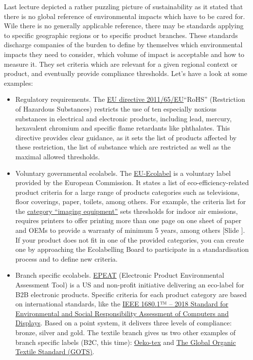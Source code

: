 \documentclass{article}
\newcounter{slide}
\begin{document}
Last lecture depicted a rather puzzling picture of sustainability as it stated that there is no global reference of environmental impacts which have to be cared for. Wile there is no generally applicable reference, there may be standards applying to specific geographic regions or to specific product branches. These standards discharge companies of the burden to define by themselves which environmental impacts they need to consider, which volume of impact is acceptable and how to measure it. They set criteria which are relevant for a given regional context or product, and eventually provide compliance thresholds. Let's have a look at some examples:
\begin{itemize}
	\item Regulatory requirements. The \href{https://eur-lex.europa.eu/legal-content/EN/TXT/?qid=1399998664957&uri=CELEX:02011L0065-20140129}{EU directive 2011/65/EU}``RoHS'' (Restriction of Hazardous Substances) restricts the use of ten especially noxious substances in electrical and electronic products, including lead, mercury, hexavalent chromium and specific flame retardants like phthalates. This directive provides clear guidance, as it sets the list of products affected by these restriction, the list of substance which are restricted as well as the maximal allowed thresholds.
	\item Voluntary governmental ecolabels. The \href{http://ec.europa.eu/environment/ecolabel/}{EU-Ecolabel} is a voluntary label provided by the European Commission. It states a list of eco-efficiency-related product criteria for a large range of products categories such as televisions, floor coverings, paper, toilets, among others. For example, the criteria list for the \href{https://eur-lex.europa.eu/LexUriServ/LexUriServ.do?uri=OJ:L:2013:353:0053:0063:EN:PDF}{category ``imaging equipment''} sets thresholds for indoor air emissions, requires printers to offer printing more than one page on one sheet of paper and OEMs to provide a warranty of minimum 5 years, among others {\color{blue}[Slide ]}. If your product does not fit in one of the provided categories, you can create one by approaching the Ecolabelling Board to participate in a standardisation process and to define new criteria. 
	\item Branch specific ecolabels. \href{http://greenelectronicscouncil.org/epeat/epeat-overview/}{EPEAT} (Electronic Product Environmental Assessment Tool) is a US and non-profit initiative delivering an eco-label for B2B electronic products. Specific criteria for each product category are based on international standards, like the \href{https://ieeexplore.ieee.org/document/8320570/}{IEEE 1680.1™ – 2018 Standard for Environmental and Social Responsibility Assessment of Computers and Displays}. Based on a point system, it delivers three levels of compliance: bronze, silver and gold. The textile branch gives us two other examples of branch specific labels (B2C, this time): \href{https://www.oeko-tex.com/}{Oeko-tex} and \href{https://www.global-standard.org/}{The Global Organic Textile Standard (GOTS)}.

\end{itemize}
\end{document}
